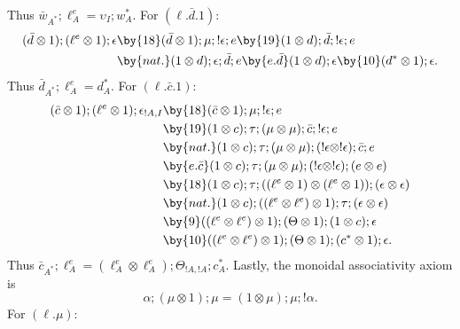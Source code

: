 Thus $\bar w_{A^*};\ell_A^e=\upsilon_I;w_A^*$.
For $(\ell.\bar d.1)$:
\begin{align*}
(\bar d\otimes1);(\ell^e\otimes1);\epsilon
&\by{18}(\bar d\otimes1);\mu;!\epsilon;e
\by{19}(1\otimes d);\bar d;!\epsilon;e\\
&\by{nat.}(1\otimes d);\epsilon;\bar d;e
\by{e.\bar d}(1\otimes d);\epsilon
\by{10}(d^*\otimes1);\epsilon.
\end{align*}
Thus $\bar d_{A^*};\ell_A^e=d_A^*$.
For $(\ell.\bar c.1)$:
\begin{align*}
(\bar c\otimes1);(\ell^e\otimes1);\epsilon_{!A,I}
&\by{18}(\bar c\otimes1);\mu;!\epsilon;e\\
&\by{19}(1\otimes c);\tau;(\mu\otimes\mu);\bar c;!\epsilon;e\\
&\by{nat.}(1\otimes c);\tau;(\mu\otimes\mu);(!\epsilon\otimes!\epsilon);\bar c;e\\
&\by{e.\bar c}(1\otimes c);\tau;(\mu\otimes\mu);(!\epsilon\otimes!\epsilon);(e\otimes e)\\
&\by{18}(1\otimes c);\tau;((\ell^e\otimes1)\otimes(\ell^e\otimes1));(\epsilon\otimes\epsilon)\\
&\by{nat.}(1\otimes c);((\ell^e\otimes\ell^e)\otimes1);\tau;(\epsilon\otimes\epsilon)\\
&\by{9}((\ell^e\otimes\ell^e)\otimes1);(\Theta\otimes1);(1\otimes c);\epsilon\\
&\by{10}((\ell^e\otimes\ell^e)\otimes1);(\Theta\otimes1);(c^*\otimes1);\epsilon.
\end{align*}
Thus $\bar c_{A^*};\ell_A^e=(\ell_A^e\otimes\ell_A^e);\Theta_{!A,!A};c_A^*$.
Lastly, the monoidal associativity axiom is
\begin{equation}
\alpha;(\mu\otimes1);\mu=(1\otimes\mu);\mu;!\alpha.\tag{20}
\end{equation}
For $(\ell.\mu)$:
